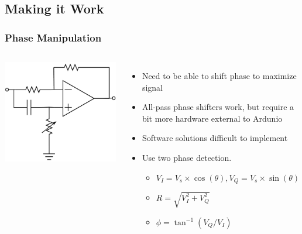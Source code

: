 \documentclass{beamer}
\begin{document}
\subsection{Making it Work}
\begin{frame}
\frametitle{Phase Manipulation}
\begin{columns}[t]
\includegraphics[scale=.2]{PhaseShift}


\begin{itemize}
\item {Need to be able to shift phase to maximize signal}
\item {All-pass phase shifters work, but require a bit more hardware external to Ardunio}
\item {Software solutions difficult to implement}
\item {Use two phase detection.}
	\begin{itemize}
	\item $V_I=V_s\times \cos(\theta), V_Q=V_s\times\sin(\theta)$
	\item $R=\sqrt{V_I^2+V_Q^2}$
	\item $\phi=\tan^{-1}(V_Q/V_I)$
	\end{itemize}
\end{itemize}

\end{columns}
\end{frame}
\end{document}
